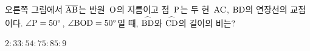 \noindent\begin{minipage}[t]{0.58\linewidth}\vspace{0pt}\raggedright 오른쪽 그림에서 $\overline{\mathrm{AB}}$는 반원~$\mathrm{O}$의 지름이고 점~$\mathrm{P}$는 두 현~$\mathrm{AC}$, $\mathrm{BD}$의 연장선의 교점이다. $\angle\mathrm{P}=50^\circ$, $\angle\mathrm{BOD}=50^\circ$일 때, $\overset{\frown}{\mathrm{BD}}$와 $\overset{\frown}{\mathrm{CD}}$의 길이의 비는?\end{minipage}\hfill\begin{minipage}[t]{0.4\linewidth}\vspace{0pt}\centering \resizebox{\ifdim\width>\linewidth\linewidth\else\width\fi}{!}{}\end{minipage}\par
\begin{choicesii}{$2:3$}{$3:5$}{$4:7$}{$5:8$}{$5:9$}\end{choicesii}
